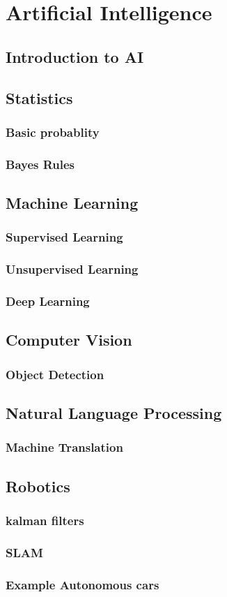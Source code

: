 \chapter{Artificial Intelligence}
\section{Introduction to AI}


\section{Statistics}
\subsection{Basic probablity}
\subsection{Bayes Rules}

\section{Machine Learning}
\subsection{Supervised Learning}
\subsection{Unsupervised Learning}
\subsection{Deep Learning}

\section{Computer Vision}
\subsection{Object Detection}

\section{Natural Language Processing}
\subsection{Machine Translation}

\section{Robotics}
\subsection{kalman filters}
\subsection{SLAM}
\subsection{Example Autonomous cars}




